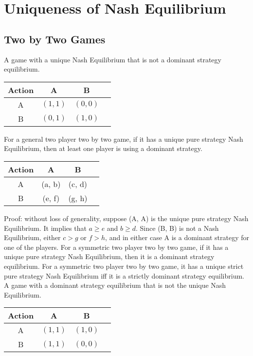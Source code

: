 \documentclass{article}
\begin{document}
\section{Uniqueness of Nash Equilibrium} 

\subsection{Two by Two Games}
A game with a unique Nash Equilibrium that is not a dominant strategy equilibrium.
\begin{center} \begin{tabular}{|c|c|c|c|}
\hline
 Action &A &B\\ \hline
A &$\left(1, 1\right)$ &$\left(0, 0\right)$\\ \hline
B &$\left(0, 1\right)$ &$\left(1, 0\right)$\\ \hline
\end{tabular} \end{center}
For a general two player two by two game, if it has a unique pure strategy Nash Equilibrium, then at least one player is using a dominant strategy.
\begin{center} \begin{tabular}{|c|c|c|c|}
\hline
 Action &A &B\\ \hline
A &(a, b) &(c, d)\\ \hline
B &(e, f) &(g, h)\\ \hline
\end{tabular} \end{center}
Proof: without loss of generality, suppose (A, A) is the unique pure strategy Nash Equilibrium. It implies that $a \geq  e$ and $b \geq  d$. Since (B, B) is not a Nash Equilibrium, either $c > g$ or $f > h$, and in either case A is a dominant strategy for one of the players.
\newline \newline
For a symmetric two player two by two game, if it has a unique pure strategy Nash Equilibrium, then it is a dominant strategy equilibrium.
\newline \newline
For a symmetric two player two by two game, it has a unique strict pure strategy Nash Equilibrium iff it is a strictly dominant strategy equilibrium.
\newline \newline
A game with a dominant strategy equilibrium that is not the unique Nash Equilibrium.
\begin{center} \begin{tabular}{|c|c|c|c|}
\hline
 Action &A &B\\ \hline
A &$\left(1, 1\right)$ &$\left(1, 0\right)$\\ \hline
B &$\left(1, 1\right)$ &$\left(0, 0\right)$\\ \hline
\end{tabular} \end{center}
\end{document}
